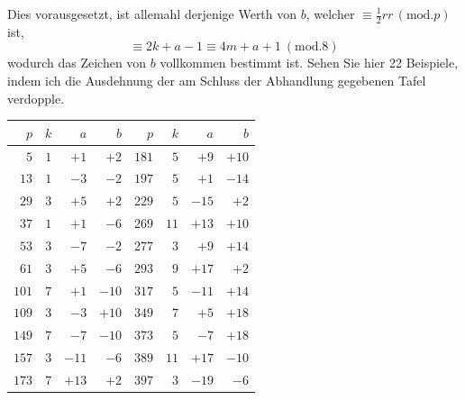 \endgroup
Dies vorausgesetzt, ist allemahl derjenige Werth von $b$, welcher $\equiv\frac12rr\, (\mathrm{mod}.p)$ ist,
\[
{}\equiv2k+a-1\equiv4m+a+1\ (\mathrm{mod}.8)
\]
wodurch das Zeichen von $b$ vollkommen bestimmt ist. Sehen Sie hier 22 Beispiele, indem ich die Ausdehnung der am Schluss der Abhandlung gegebenen Tafel verdopple.
\begin{center}
\begin{tabular}{r|r|r|r||r|r|r|r}
$p$&$k$&$a$&$b$&$p$&$k$&$a$&$b$\\\hline
$5$&$1$&$+1$&$+2$&$181$&$5$&$+9$&$+10$\\
$13$&$1$&$-3$&$-2$&$197$&$5$&$+1$&$-14$\\
$29$&$3$&$+5$&$+2$&$229$&$5$&$-15$&$+2$\\
$37$&$1$&$+1$&$-6$&$269$&$11$&$+13$&$+10$\\
$53$&$3$&$-7$&$-2$&$277$&$3$&$+9$&$+14$\\
$61$&$3$&$+5$&$-6$&$293$&$9$&$+17$&$+2$\\
$101$&$7$&$+1$&$-10$&$317$&$5$&$-11$&$+14$\\
$109$&$3$&$-3$&$+10$&$349$&$7$&$+5$&$+18$\\
$149$&$7$&$-7$&$-10$&$373$&$5$&$-7$&$+18$\\
$157$&$3$&$-11$&$-6$&$389$&$11$&$+17$&$-10$\\
$173$&$7$&$+13$&$+2$&$397$&$3$&$-19$&$-6$\\
\end{tabular}
\end{center}
